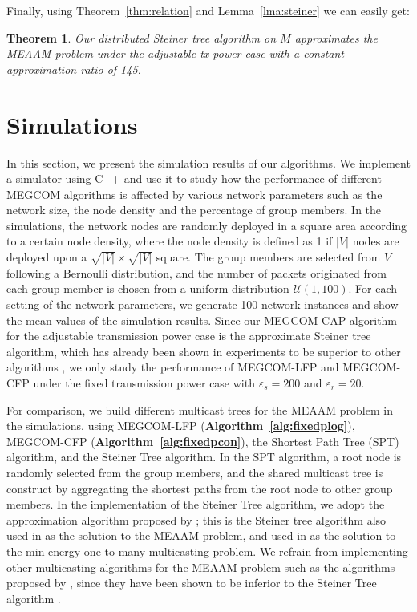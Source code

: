 \documentclass[10pt, conference, compsocconf]{IEEEtran}
\newtheorem{theorem}{\textbf{Theorem}}
\begin{document}
  Finally, using Theorem~\ref{thm:relation} and Lemma~\ref{lma:steiner} we can easily get:
\begin{theorem}
Our distributed Steiner tree algorithm on $M$ approximates the MEAAM problem under the adjustable tx power case with a constant approximation ratio of 145. \label{thm:adjustable}
\end{theorem}

\section{Simulations} \label{sec:sim}
In this section, we present the simulation results of our algorithms. We implement a simulator using C++ and use it to study how the performance of different MEGCOM algorithms is affected by various network parameters such as the network size, the node density and the percentage of group members. In the simulations, the network nodes are randomly deployed in a square area according to a certain node density, where the node density is defined as 1 if $|V|$ nodes are deployed upon a $\sqrt{|V|}\times\sqrt{|V|}$ square. The group members are selected from $V$ following a Bernoulli distribution, and the number of packets originated from each group member is chosen from a uniform distribution $\mathcal{U}(1, 100)$. For each setting of the network parameters, we generate 100 network instances and show the mean values of the simulation results. Since our MEGCOM-CAP algorithm for the adjustable transmission power case is the approximate Steiner tree algorithm, which has already been shown in experiments to be superior to other algorithms \cite{Liang2009}, we only study the performance of MEGCOM-LFP and MEGCOM-CFP under the fixed transmission power case with $\varepsilon_s=200$ and $\varepsilon_r=20$.

  For comparison, we build different multicast trees for the MEAAM problem in the simulations, using MEGCOM-LFP (\textbf{Algorithm~\ref{alg:fixedplog}}), MEGCOM-CFP (\textbf{Algorithm~\ref{alg:fixedpcon}}), the Shortest Path Tree (SPT) algorithm, and the Steiner Tree algorithm. In the SPT algorithm, a root node is randomly selected from the group members, and the shared multicast tree is construct by aggregating the shortest paths from the root node to other group members. In the implementation of the Steiner Tree algorithm, we adopt the approximation algorithm proposed by \cite{Kou1981}; this is the Steiner tree algorithm also used in \cite{Liang2009} as the solution to the MEAAM problem, and used in \cite{Wan2004} as the solution to the min-energy one-to-many multicasting problem. We refrain from implementing other multicasting algorithms for the MEAAM problem such as the algorithms proposed by \cite{Chiang1998,Ji1998}, since they have been shown to be inferior to the Steiner Tree algorithm \cite{Liang2009}.
\end{document}
